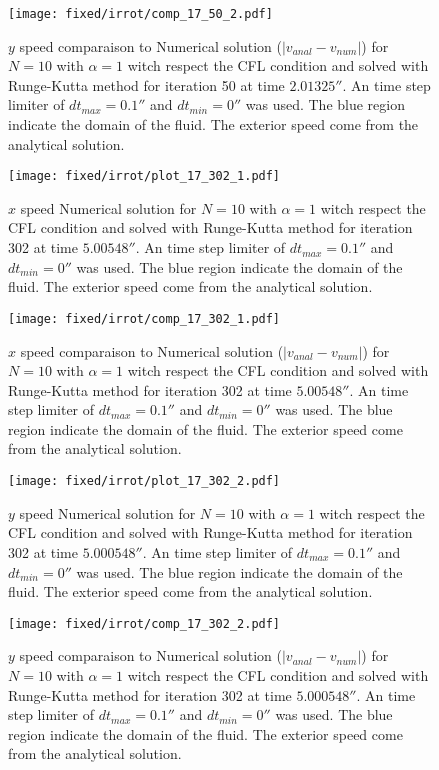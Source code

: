 \begin{figure}
\texttt{[image: fixed/irrot/comp\_17\_50\_2.pdf]}
\caption{$y$ speed comparaison to Numerical solution ($|v_{anal}-v_{num}|$) for $N=10$ with $\alpha=1$ witch respect the CFL condition and solved with Runge-Kutta method
for iteration 50 at time $\unit{2.01325}{\second}$.
An time step limiter of $dt_{max}=\unit{0.1}{\second}$ and $dt_{min}=\unit{0}{\second}$ was used.
The blue region indicate the domain of the fluid. The exterior speed come from the analytical solution.
\label{fix:comp_17_50_2}
}
\end{figure}

\begin{figure}
\texttt{[image: fixed/irrot/plot\_17\_302\_1.pdf]}
\caption{$x$ speed Numerical solution for $N=10$ with $\alpha=1$ witch respect the CFL condition and solved with Runge-Kutta method
for iteration 302 at time $\unit{5.00548}{\second}$.
An time step limiter of $dt_{max}=\unit{0.1}{\second}$ and $dt_{min}=\unit{0}{\second}$ was used.
The blue region indicate the domain of the fluid. The exterior speed come from the analytical solution.
\label{fix:plot_17_302_1}
}
\end{figure}

\begin{figure}
\texttt{[image: fixed/irrot/comp\_17\_302\_1.pdf]}
\caption{$x$ speed comparaison to Numerical solution ($|v_{anal}-v_{num}|$) for $N=10$ with $\alpha=1$ witch respect the CFL condition and solved with Runge-Kutta method
for iteration 302 at time $\unit{5.00548}{\second}$.
An time step limiter of $dt_{max}=\unit{0.1}{\second}$ and $dt_{min}=\unit{0}{\second}$ was used.
The blue region indicate the domain of the fluid. The exterior speed come from the analytical solution.
\label{fix:comp_17_302_1}
}
\end{figure}

\begin{figure}
\texttt{[image: fixed/irrot/plot\_17\_302\_2.pdf]}
\caption{$y$ speed Numerical solution for $N=10$ with $\alpha=1$ witch respect the CFL condition and solved with Runge-Kutta method
for iteration 302 at time $\unit{5.000548}{\second}$.
An time step limiter of $dt_{max}=\unit{0.1}{\second}$ and $dt_{min}=\unit{0}{\second}$ was used.
The blue region indicate the domain of the fluid. The exterior speed come from the analytical solution.
\label{fix:plot_17_302_2}
}
\end{figure}

\begin{figure}
\texttt{[image: fixed/irrot/comp\_17\_302\_2.pdf]}
\caption{$y$ speed comparaison to Numerical solution ($|v_{anal}-v_{num}|$) for $N=10$ with $\alpha=1$ witch respect the CFL condition and solved with Runge-Kutta method
for iteration 302 at time $\unit{5.000548}{\second}$.
An time step limiter of $dt_{max}=\unit{0.1}{\second}$ and $dt_{min}=\unit{0}{\second}$ was used.
The blue region indicate the domain of the fluid. The exterior speed come from the analytical solution.
\label{fix:comp_17_302_2}
}
\end{figure}